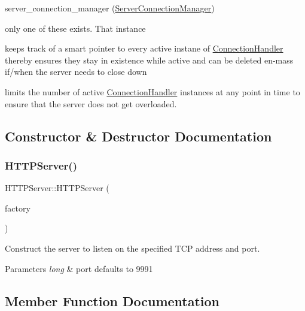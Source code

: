 server\+\_\+connection\+\_\+manager (\hyperlink{class_server_connection_manager}{Server\+Connection\+Manager})
\begin{DoxyItemize}
\item only one of these exists. That instance
\item keeps track of a smart pointer to every active instane of \hyperlink{class_connection_handler}{Connection\+Handler} thereby ensures they stay in existence while active and can be deleted en-\/mass if/when the server needs to close down
\item limits the number of active \hyperlink{class_connection_handler}{Connection\+Handler} instances at any point in time to ensure that the server does not get overloaded. 
\end{DoxyItemize}

\subsection{Constructor \& Destructor Documentation}
\mbox{\label{class_h_t_t_p_server_a5a5f52fff7b98136607a692aa06d8ba4}} 
\subsubsection{\texorpdfstring{H\+T\+T\+P\+Server()}{HTTPServer()}}
{\footnotesize\ttfamily H\+T\+T\+P\+Server\+::\+H\+T\+T\+P\+Server (\begin{DoxyParamCaption}\item[{Request\+Handler\+Factory}]{factory }\end{DoxyParamCaption})\hspace{0.3cm}{\ttfamily [explicit]}}



Construct the server to listen on the specified T\+CP address and port. 


\begin{DoxyParams}{Parameters}
{\em long} & port defaults to 9991 \\
\hline
\end{DoxyParams}


\subsection{Member Function Documentation}
\mbox{\label{class_h_t_t_p_server_a903d110951861510bd885333ee22fb6c}} 
